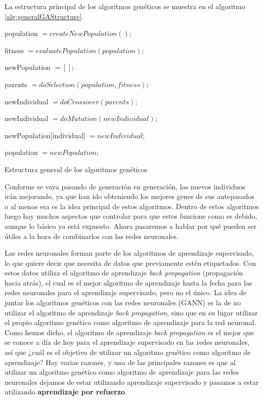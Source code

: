 La estructura principal de los algoritmos genéticos se muestra en el algoritmo \ref{alg:generalGAStructure}.

\vspace{2mm}
\begin{algorithm}[H]
    population $= createNewPopulation();$
    
    {
        fitness $= evaluatePopulation(population);$
        
        newPopulation $= [];$
        
        {
            parents $= doSelection(population, fitness);$
            
            newIndividual $= doCrossover(parents);$
            
            newIndividual $= doMutation(newIndividual);$
            
            newPopulation[individual] $= newIndividual;$
        }
        
        population $= newPopulation;$
    }
	\caption{Estructura general de los algoritmos genéticos}
	\label{alg:generalGAStructure}
\end{algorithm}
\vspace{2mm}

Conforme se vaya pasando de generación en generación, los nuevos individuos irán mejorando, ya que han ido obteniendo los mejores genes de sus antepasados o al menos esa es la idea principal de estos algoritmos. Dentro de estos algoritmos luego hay muchos aspectos que controlar para que estos funcione como es debido, aunque lo básico ya está expuesto. Ahora pasaremos a hablar por qué pueden ser útiles a la hora de combinarlos con las redes neuronales.

Las redes neuronales forman parte de los algoritmos de aprendizaje supervisado, lo que quiere decir que necesita de datos que previamente estén etiquetados. Con estos datos utiliza el algoritmo de aprendizaje \textit{back propagation} (propagación hacia atrás), el cual es el mejor algoritmo de aprendizaje hasta la fecha para las redes neuronales para el aprendizaje supervisado, pero no el único. La idea de juntar los algoritmos genéticos con las redes neuronales (GANN) es la de no utilizar el algoritmo de aprendizaje \textit{back propagation}, sino que en su lugar utilizar el propio algoritmo genético como algoritmo de aprendizaje para la red neuronal. Como hemos dicho, el algoritmo de aprendizaje \textit{back propagation} es el mejor que se conoce a día de hoy para el aprendizaje supervisado en las redes neuronales, así que ¿cuál es el objetivo de utilizar un algoritmo genético como algoritmo de aprendizaje? Hay varias razones, y una de las principales razones es que al utilizar un algoritmo genético como algoritmo de aprendizaje para las redes neuronales dejamos de estar utilizando aprendizaje supervisado y pasamos a estar utilizando \textbf{aprendizaje por refuerzo}.

